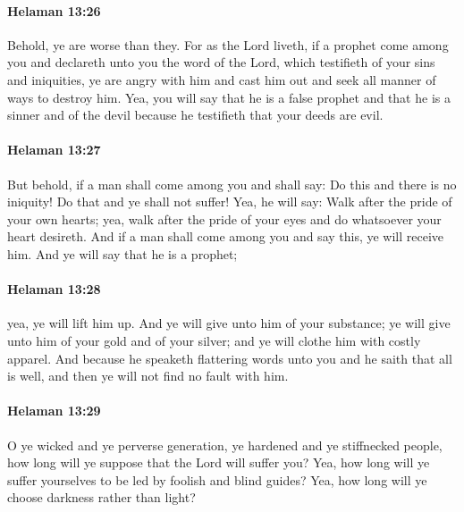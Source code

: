 		\paragraph{Helaman 13:26} %
			\label{HELAMAN-13-26}

			Behold, ye are worse than they.
			For as the Lord liveth,
			if a prophet come among you
			and declareth unto you the word of the Lord,
			which testifieth of your sins and iniquities,
			ye are angry with him and cast him out
			and seek all manner of ways to destroy him.
			Yea, you will say that he is a false prophet
			and that he is a sinner and of the devil
			because he testifieth that your deeds are evil.

		\paragraph{Helaman 13:27} %
			\label{HELAMAN-13-27}

			But behold, if a man shall come among you and shall say:
			Do this and there is no iniquity!
			Do that and ye shall not suffer!
			Yea, he will say:
			Walk after the pride of your own hearts;
			yea, walk after the pride of your eyes
			and do whatsoever your heart desireth.
			And if a man shall come among you and say this,
			ye will receive him.
			And ye will say that he is a prophet;

		\paragraph{Helaman 13:28} %
			\label{HELAMAN-13-28}

			yea, ye will lift him up.
			And ye will give unto him of your substance;
			ye will give unto him of your gold and of your silver;
			and ye will clothe him with costly apparel.
			And because he speaketh flattering words unto you
			and he saith that all is well,
			and then ye will not find no fault with him.

		\paragraph{Helaman 13:29} %
			\label{HELAMAN-13-29}

			O ye wicked and ye perverse generation,
			ye hardened and ye stiffnecked people,
			how long will ye suppose that the Lord will suffer you?
			Yea, how long will ye suffer yourselves to be led by foolish and blind guides?
			Yea, how long will ye choose darkness rather than light?

